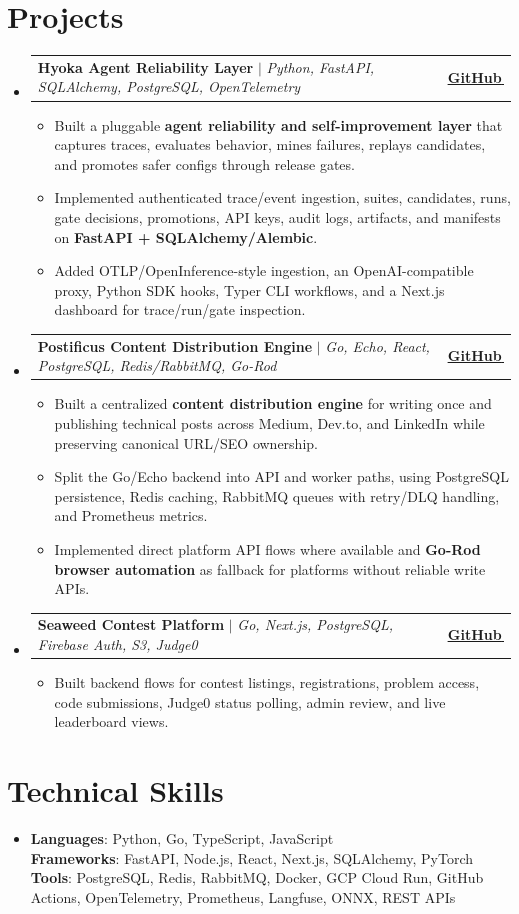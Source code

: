\documentclass[letterpaper,11pt]{article}
\makeatletter
\newcommand{\bodyhref}[2]{\href{#1}{\underline{#2}\,\faExternalLink*}}
\newcommand{\resumeItem}[1]{\item{\fontsize{8.82pt}{9.28pt}\selectfont #1\vspace{-0.7pt}}}
\newcommand{\resumeProjectHeading}[2]{
    \item
    \begin{tabular*}{1.0\textwidth}{l@{\extracolsep{\fill}}r}
      \small#1 & \textbf{\small #2}\\
    \end{tabular*}\vspace{-4pt}
}
\newcommand{\resumeSubHeadingListStart}{\begin{itemize}[leftmargin=0.0in, label={}, itemsep=0.6pt, topsep=0pt, parsep=0pt, partopsep=0pt]}
\newcommand{\resumeSubHeadingListEnd}{\end{itemize}}
\newcommand{\resumeItemListStart}{\begin{itemize}[leftmargin=0.16in,itemsep=0.3pt,topsep=0.9pt,parsep=0pt,partopsep=0pt]}
\newcommand{\resumeItemListEnd}{\end{itemize}\vspace{-3pt}}
\makeatother
\begin{document}
\section{Projects}
\resumeSubHeadingListStart
\resumeProjectHeading
{\textbf{Hyoka Agent Reliability Layer} $|$ \emph{Python, FastAPI, SQLAlchemy, PostgreSQL, OpenTelemetry}}{\bodyhref{https://github.com/unichronic/hyoka}{GitHub}}
\resumeItemListStart
\resumeItem{Built a pluggable \textbf{agent reliability and self-improvement layer} that captures traces, evaluates behavior, mines failures, replays candidates, and promotes safer configs through release gates.}
\resumeItem{Implemented authenticated trace/event ingestion, suites, candidates, runs, gate decisions, promotions, API keys, audit logs, artifacts, and manifests on \textbf{FastAPI + SQLAlchemy/Alembic}.}
\resumeItem{Added OTLP/OpenInference-style ingestion, an OpenAI-compatible proxy, Python SDK hooks, Typer CLI workflows, and a Next.js dashboard for trace/run/gate inspection.}
\resumeItemListEnd
\resumeProjectHeading
{\textbf{Postificus Content Distribution Engine} $|$ \emph{Go, Echo, React, PostgreSQL, Redis/RabbitMQ, Go-Rod}}{\bodyhref{https://github.com/unichronic/postificus}{GitHub}}
\resumeItemListStart
\resumeItem{Built a centralized \textbf{content distribution engine} for writing once and publishing technical posts across Medium, Dev.to, and LinkedIn while preserving canonical URL/SEO ownership.}
\resumeItem{Split the Go/Echo backend into API and worker paths, using PostgreSQL persistence, Redis caching, RabbitMQ queues with retry/DLQ handling, and Prometheus metrics.}
\resumeItem{Implemented direct platform API flows where available and \textbf{Go-Rod browser automation} as fallback for platforms without reliable write APIs.}
\resumeItemListEnd
\resumeProjectHeading
{\textbf{Seaweed Contest Platform} $|$ \emph{Go, Next.js, PostgreSQL, Firebase Auth, S3, Judge0}}{\bodyhref{https://github.com/unichronic/seaweed-fe}{GitHub}}
\resumeItemListStart
\resumeItem{Built backend flows for contest listings, registrations, problem access, code submissions, Judge0 status polling, admin review, and live leaderboard views.}
\resumeItemListEnd
\resumeSubHeadingListEnd

\section{Technical Skills}
\begin{itemize}[leftmargin=0.15in, label={}, topsep=0pt, itemsep=0pt, parsep=0pt, partopsep=0pt]
  \item{\fontsize{9.0pt}{9.25pt}\selectfont
   \textbf{Languages}{: Python, Go, TypeScript, JavaScript} \\
   \textbf{Frameworks}{: FastAPI, Node.js, React, Next.js, SQLAlchemy, PyTorch} \\
   \textbf{Tools}{: PostgreSQL, Redis, RabbitMQ, Docker, GCP Cloud Run, GitHub Actions, OpenTelemetry, Prometheus, Langfuse, ONNX, REST APIs} \\
  }
\end{itemize}
\end{document}
